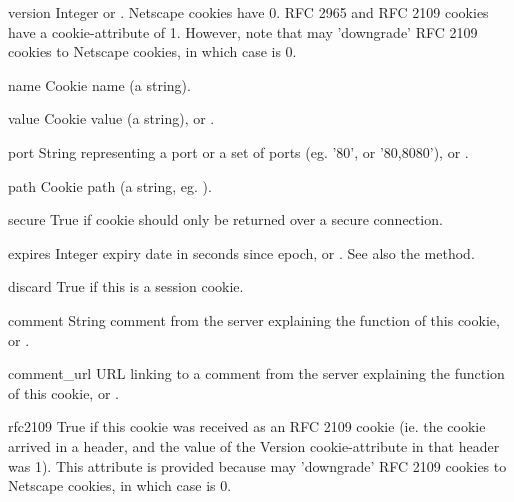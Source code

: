 \begin{memberdesc}[Cookie]{version}
Integer or .  Netscape cookies have  0.
RFC 2965 and RFC 2109 cookies have a  cookie-attribute
of 1.  However, note that  may 'downgrade' RFC 2109
cookies to Netscape cookies, in which case  is 0.
\end{memberdesc}
\begin{memberdesc}[Cookie]{name}
Cookie name (a string).
\end{memberdesc}
\begin{memberdesc}[Cookie]{value}
Cookie value (a string), or .
\end{memberdesc}
\begin{memberdesc}[Cookie]{port}
String representing a port or a set of ports (eg. '80', or '80,8080'),
or .
\end{memberdesc}
\begin{memberdesc}[Cookie]{path}
Cookie path (a string, eg. ).
\end{memberdesc}
\begin{memberdesc}[Cookie]{secure}
True if cookie should only be returned over a secure connection.
\end{memberdesc}
\begin{memberdesc}[Cookie]{expires}
Integer expiry date in seconds since epoch, or .  See
also the  method.
\end{memberdesc}
\begin{memberdesc}[Cookie]{discard}
True if this is a session cookie.
\end{memberdesc}
\begin{memberdesc}[Cookie]{comment}
String comment from the server explaining the function of this cookie,
or .
\end{memberdesc}
\begin{memberdesc}[Cookie]{comment_url}
URL linking to a comment from the server explaining the function of
this cookie, or .
\end{memberdesc}
\begin{memberdesc}[Cookie]{rfc2109}
True if this cookie was received as an RFC 2109 cookie (ie. the cookie
arrived in a  header, and the value of the
Version cookie-attribute in that header was 1).  This attribute is
provided because  may 'downgrade' RFC 2109 cookies
to Netscape cookies, in which case  is 0.
\end{memberdesc}

